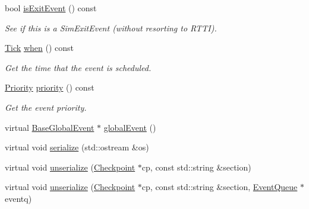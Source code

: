 \begin{DoxyCompactItemize}
bool \hyperlink{classEvent_a6035963416c1279143194a9bcd88b314}{isExitEvent} () const 
\begin{DoxyCompactList}\small\item\em See if this is a SimExitEvent (without resorting to RTTI). \item\end{DoxyCompactList}\item 
\hyperlink{base_2types_8hh_a5c8ed81b7d238c9083e1037ba6d61643}{Tick} \hyperlink{classEvent_a1883243a0117678c5695f2435dcabbdc}{when} () const 
\begin{DoxyCompactList}\small\item\em Get the time that the event is scheduled. \item\end{DoxyCompactList}\item 
\hyperlink{classEventBase_a6d92f7ee8144a5911ed46d85a89a4934}{Priority} \hyperlink{classEvent_af295b292a101253257e5c9bea7ca67e3}{priority} () const 
\begin{DoxyCompactList}\small\item\em Get the event priority. \item\end{DoxyCompactList}\item 
virtual \hyperlink{classBaseGlobalEvent}{BaseGlobalEvent} $\ast$ \hyperlink{classEvent_a22afab66586c2982ac7548fba9e6835b}{globalEvent} ()
\item 
virtual void \hyperlink{classEvent_ad6272f80ae37e8331e3969b3f072a801}{serialize} (std::ostream \&os)
\item 
virtual void \hyperlink{classEvent_af100c4e9feabf3cd918619c88c718387}{unserialize} (\hyperlink{classCheckpoint}{Checkpoint} $\ast$cp, const std::string \&section)
\item 
virtual void \hyperlink{classEvent_a906bb365c627ae3a9ae49fc646d267cf}{unserialize} (\hyperlink{classCheckpoint}{Checkpoint} $\ast$cp, const std::string \&section, \hyperlink{classEventQueue}{EventQueue} $\ast$eventq)
\end{DoxyCompactItemize}
